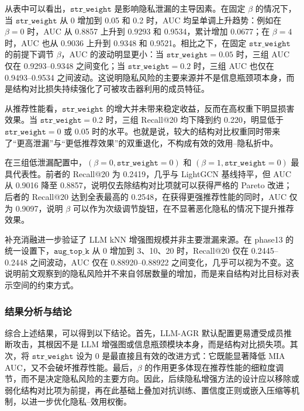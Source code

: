 从表中可以看出，$\texttt{str\_weight}$ 是影响隐私泄漏的主导因素。在固定 $\beta$ 的情况下，当 $\texttt{str\_weight}$ 从 0 增加到 0.05 和 0.2 时，AUC 均呈单调上升趋势：例如在 $\beta=0$ 时，AUC 从 0.8857 上升到 0.9293 和 0.9534，累计增加 0.0677；在 $\beta=4$ 时，AUC 也从 0.9036 上升到 0.9348 和 0.9521。相比之下，在固定 $\texttt{str\_weight}$ 的前提下调节 $\beta$，AUC 的波动明显更小：当 $\texttt{str\_weight}=0.05$ 时，三组 AUC 仅在 0.9293--0.9348 之间变化；当 $\texttt{str\_weight}=0.2$ 时，三组 AUC 也仅在 0.9493--0.9534 之间波动。这说明隐私风险的主要来源并不是信息瓶颈项本身，而是结构对比损失持续强化了可被攻击器利用的成员特征。

从推荐性能看，$\texttt{str\_weight}$ 的增大并未带来稳定收益，反而在高权重下明显损害效果。当 $\texttt{str\_weight}=0.2$ 时，三组 Recall@20 均下降到约 0.220，明显低于 $\texttt{str\_weight}=0$ 或 0.05 时的水平。也就是说，较大的结构对比权重同时带来了``更高泄漏''与``更低推荐效果''的双重退化，不构成有效的效用--隐私折中。

在三组低泄漏配置中，$(\beta=0,\texttt{str\_weight}=0)$ 和 $(\beta=1,\texttt{str\_weight}=0)$ 最具代表性。前者的 Recall@20 为 0.2419，几乎与 LightGCN 基线持平，但 AUC 从 0.9016 降至 0.8857，说明仅去除结构对比项就可以获得严格的 Pareto 改进；后者的 Recall@20 达到全表最高的 0.2548，在获得更强推荐性能的同时，AUC 仅为 0.9097，说明 $\beta$ 可以作为次级调节旋钮，在不显著恶化隐私的情况下提升推荐效果。

补充消融进一步验证了 LLM kNN 增强图规模并非主要泄漏来源。在 phase13 的统一设置下，$\texttt{aug\_top\_k}$ 从 0 增加到 3、10、20 时，Recall@20 仅在 0.2445--0.2448 之间波动，AUC 仅在 0.88920--0.88922 之间变化，几乎可以视为不变。这说明前文观察到的隐私风险并不来自邻居数量的增加，而是来自结构对比目标对表示空间的约束方式。

\subsubsection{结果分析与结论}
综合上述结果，可以得到以下结论。首先，LLM-AGR 默认配置更易遭受成员推断攻击，其根因不是 LLM 增强图或信息瓶颈模块本身，而是结构对比损失项。其次，将 $\texttt{str\_weight}$ 设为 0 是最直接且有效的改进方式：它既能显著降低 MIA AUC，又不会破坏推荐性能。最后，$\beta$ 的作用更多体现在推荐性能的细粒度调节，而不是决定隐私风险的主要方向。因此，后续隐私增强方法的设计应以移除或弱化结构对比项为前提，再在此基础上叠加对抗训练、置信度正则或嵌入压缩等机制，以进一步优化隐私--效用权衡。
